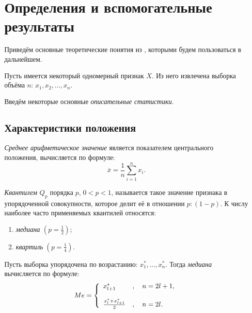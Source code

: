 \newpage
\chapter{Определения и вспомогательные результаты}
\label{c:theory}

Приведём основные теоретические понятия из \cite{Eliseeva1995}, которыми будем пользоваться в дальнейшем.

Пусть имеется некоторый одномерный признак $X$. Из него извлечена выборка объёма $n$: $x_1, x_2, \ldots, x_n$.

Введём некоторые основные \textit{описательные статистики}.

\section*{Характеристики положения} %
\label{sec:chars_pos}

\textit{Среднее арифметическое значение} является показателем 
центрального положения, вычисляется по формуле:
\begin{equation*}
	\overline{x} = \frac{1}{n} \sum_{i=1}^n{x_i}.
\end{equation*}
 
\textit{Квантилем $Q_p$} порядка $p$, $0<p<1$, называется такое значение признака в упорядоченной совокупности, которое делит её в отношении $p: (1 - p)$. К числу наиболее часто применяемых квантилей относятся:
\begin{enumerate}
	\item \textit{медиана} $(p = \frac{1}{2})$;
	\item \textit{квартиль} $(p = \frac{1}{4})$.
\end{enumerate}

Пусть выборка упорядочена по возрастанию: $x_{1}^{*}, \ldots, x_{n}^{*}$. Тогда \textit{медиана} вычисляется по формуле:
\begin{equation*}
Me = \left\{
 \begin{array}{l l}
   x_{l+1}^{*} &, \quad n = 2l + 1, \\
   \\
   \frac{x_l^{*} + x_{l+1}^{*}}{2} &, \quad n = 2l.
 \end{array} \right.
\end{equation*}


